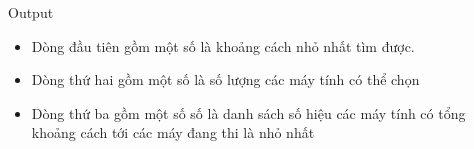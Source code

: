 Output  
\begin{itemize}
	\item     Dòng đầu tiên gồm một số là khoảng cách nhỏ nhất tìm được.   
	\item     Dòng thứ hai gồm một số là số lượng các máy tính có thể chọn   
	\item     Dòng thứ ba gồm một số số là danh sách số hiệu các máy tính có tổng khoảng cách tới các máy đang thi là nhỏ nhất   
\end{itemize}